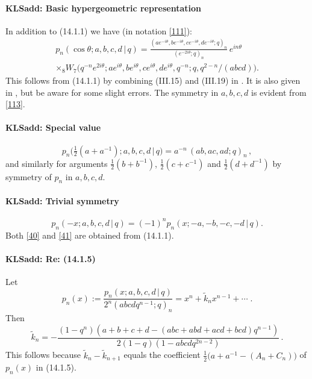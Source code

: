 \documentclass[envcountchap,graybox]{svmono}
\newcounter{rom}
\newcommand\tha\theta
\newcommand\thalf{\tfrac12}
\newcommand\wt{\widetilde}
\begin{document}
\paragraph{\large\bf KLSadd: Basic hypergeometric representation}In addition to (14.1.1) we have (in notation \eqref{111}):
\begin{multline}
p_n(\cos\tha;a,b,c,d\,|\, q)
=\frac{(ae^{-i\tha},be^{-i\tha},ce^{-i\tha},de^{-i\tha};q)_n}
{(e^{-2i\tha};q)_n}\,e^{in\tha}\\
\times {}_8W_7\big(q^{-n}e^{2i\tha};ae^{i\tha},be^{i\tha},
ce^{i\tha},de^{i\tha},q^{-n};q,q^{2-n}/(abcd)\big).
\label{113}
\end{multline}
This follows from (14.1.1) by combining (III.15) and (III.19) in
.
It is also given in , but be aware for some slight errors.
The symmetry in $a,b,c,d$ is evident from \eqref{113}.
%
\paragraph{\large\bf KLSadd: Special value}\begin{equation}
p_n\big(\thalf(a+a^{-1});a,b,c,d\,|\, q\big)=a^{-n}\,(ab,ac,ad;q)_n\,,
\label{40}
\end{equation}
and similarly for arguments $\thalf(b+b^{-1})$, $\thalf(c+c^{-1})$ and
$\thalf(d+d^{-1})$ by symmetry of $p_n$ in $a,b,c,d$.
%
\paragraph{\large\bf KLSadd: Trivial symmetry}\begin{equation}
p_n(-x;a,b,c,d\,|\, q)=(-1)^n p_n(x;-a,-b,-c,-d\,|\, q).
\label{41}
\end{equation}
Both \eqref{40} and \eqref{41} are obtained from (14.1.1).
%
\paragraph{\large\bf KLSadd: Re: (14.1.5)}Let
\begin{equation}
p_n(x):=\frac{p_n(x;a,b,c,d\,|\, q)}{2^n(abcdq^{n-1};q)_n}=x^n+\wt k_n x^{n-1}
+\cdots\;.
\label{18}
\end{equation}
Then
\begin{equation}
\wt k_n=-\frac{(1-q^n)(a+b+c+d-(abc+abd+acd+bcd)q^{n-1})}
{2(1-q)(1-abcdq^{2n-2})}\,.
\label{19}
\end{equation}
This follows because $\tilde k_n-\tilde k_{n+1}$ equals the coefficient
$\thalf\bigl(a+a^{-1}-(A_n+C_n)\bigr)$ of $p_n(x)$ in (14.1.5).
%
\end{document}
